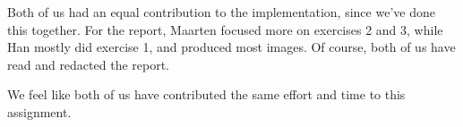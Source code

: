 \addtocounter{exerciseCount}{1} \noindent {} \par
Both of us had an equal contribution to the implementation, since we've done this together.
For the report, Maarten focused more on exercises 2 and 3, while Han mostly did exercise 1, and produced most images.
Of course, both of us have read and redacted the report.

We feel like both of us have contributed the same effort and time to this assignment.